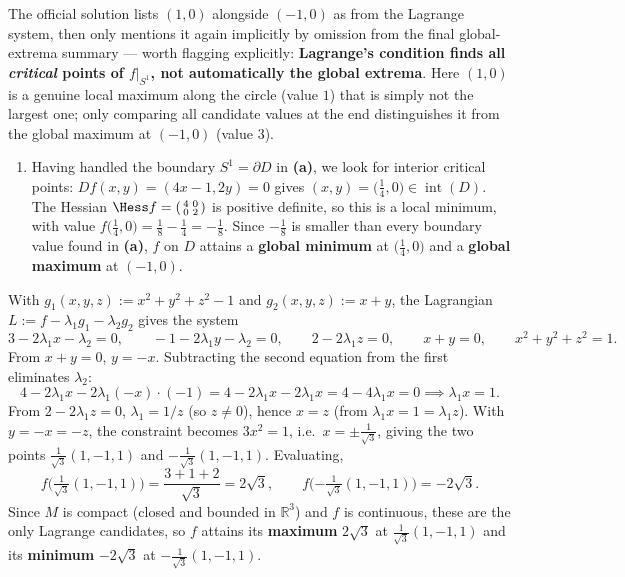 \begin{ainote}
The official solution lists $(1,0)$ alongside $(-1,0)$ as  from the Lagrange
system, then only mentions it again implicitly by omission from the final global-extrema summary
--- worth flagging explicitly: \textbf{Lagrange's condition finds all \emph{critical} points of
$f|_{S^1}$, not automatically the global extrema}. Here $(1,0)$ is a genuine local maximum along
the circle (value $1$) that is simply not the largest one; only comparing all candidate values
at the end distinguishes it from the global maximum at $(-1,0)$ (value $3$).
\end{ainote}

\begin{exercisesolution}
\begin{enumerate}[label=\textbf{(\alph*)}, start=2]
  \item Having handled the boundary $S^1 = \partial D$ in \textbf{(a)}, we look for interior
    critical points: $Df(x,y) = (4x-1, 2y) = 0$ gives $(x,y) = \big(\tfrac14, 0\big) \in
    \operatorname{int}(D)$. The Hessian $\Hess f = \left(\begin{smallmatrix} 4 & 0 \\ 0 & 2\end{smallmatrix}\right)$ is
    positive definite, so this is a local minimum, with value $f\big(\tfrac14,0\big) =
    \tfrac18 - \tfrac14 = -\tfrac18$. Since $-\tfrac18$ is smaller than every boundary value found
    in \textbf{(a)}, $f$ on $D$ attains a \textbf{global minimum} at $\big(\tfrac14,0\big)$ and a
    \textbf{global maximum} at $(-1,0)$.
\end{enumerate}
\end{exercisesolution}

\begin{exercisesolution}
With $g_1(x,y,z) := x^2+y^2+z^2-1$ and $g_2(x,y,z) := x+y$, the Lagrangian
$L := f - \lambda_1 g_1 - \lambda_2 g_2$ gives the system
\[3 - 2\lambda_1 x - \lambda_2 = 0, \qquad -1-2\lambda_1 y - \lambda_2 = 0, \qquad 2 - 2\lambda_1 z = 0, \qquad x+y=0, \qquad x^2+y^2+z^2=1.\]
From $x+y=0$, $y=-x$. Subtracting the second equation from the first eliminates $\lambda_2$:
\[4 - 2\lambda_1 x - 2\lambda_1(-x) \cdot(-1)= 4-2\lambda_1x-2\lambda_1x=4-4\lambda_1 x = 0 \implies \lambda_1 x = 1.\]
From $2-2\lambda_1 z=0$, $\lambda_1 = 1/z$ (so $z \neq 0$), hence $x = z$ (from $\lambda_1 x = 1 =
\lambda_1 z$). With $y=-x=-z$, the constraint becomes $3x^2 = 1$, i.e.\ $x = \pm\tfrac{1}{\sqrt3}$,
giving the two points $\tfrac{1}{\sqrt3}(1,-1,1)$ and $-\tfrac{1}{\sqrt3}(1,-1,1)$. Evaluating,
\[f\Big(\tfrac{1}{\sqrt3}(1,-1,1)\Big) = \frac{3+1+2}{\sqrt3} = 2\sqrt3, \qquad f\Big({-\tfrac{1}{\sqrt3}}(1,-1,1)\Big) = -2\sqrt3.\]
Since $M$ is compact (closed and bounded in $\mathbb{R}^3$) and $f$ is continuous, these are the
only Lagrange candidates, so $f$ attains its \textbf{maximum} $2\sqrt3$ at $\tfrac{1}{\sqrt3}(1,-1,1)$
and its \textbf{minimum} $-2\sqrt3$ at $-\tfrac{1}{\sqrt3}(1,-1,1)$.
\end{exercisesolution}

